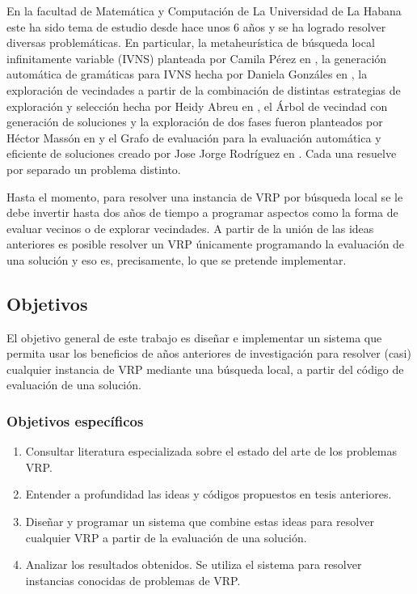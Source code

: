 En la facultad de Matemática y Computación de La Universidad de La Habana este ha sido tema de estudio desde hace unos 6 años y se ha logrado resolver diversas problemáticas. En particular, la metaheurística de búsqueda local infinitamente variable (IVNS) planteada por Camila Pérez en \cite{Camila}, la generación automática de gramáticas para IVNS hecha por Daniela Gonzáles en \cite{Daniela}, la exploración de vecindades a partir de la combinación de distintas estrategias de exploración y selección hecha por Heidy Abreu en \cite{Heidy}, el Árbol de vecindad con generación de soluciones y la exploración de dos fases fueron planteados por Héctor Massón en \cite{Hector} y el Grafo de evaluación para la evaluación automática y eficiente de soluciones creado por Jose Jorge Rodríguez en \cite{JJ}. Cada una resuelve por separado un problema distinto. 

Hasta el momento, para resolver una instancia de VRP por búsqueda local se le debe invertir hasta dos años de tiempo a programar aspectos como la forma de evaluar vecinos o de explorar vecindades. A partir de la unión de las ideas anteriores es posible resolver un VRP únicamente programando la evaluación de una solución y eso es, precisamente, lo que se pretende implementar. 


\subsection*{Objetivos}
El objetivo general de este trabajo es diseñar e implementar un sistema que permita usar los beneficios de años anteriores de investigación para resolver (casi) cualquier instancia de VRP mediante una búsqueda local, a partir del código de evaluación de una solución.

\subsubsection*{Objetivos específicos}

\begin{enumerate}
	\item Consultar literatura especializada sobre el estado del arte de los problemas VRP.
	\item Entender a profundidad las ideas y códigos propuestos en tesis anteriores.
	\item Diseñar y programar un sistema que combine estas ideas para resolver cualquier VRP a partir de la evaluación de una solución.
	\item Analizar los resultados obtenidos. Se utiliza el sistema para resolver instancias conocidas de problemas de VRP.
\end{enumerate}

